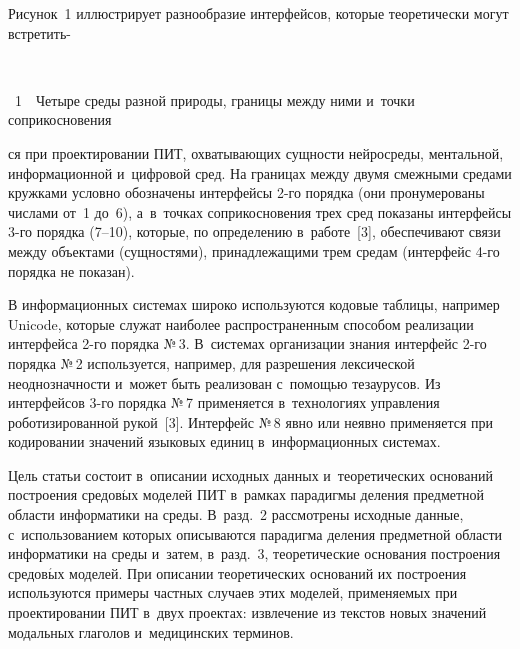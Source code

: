 \begin{multicols}{2}
  Рисунок~1 иллюстрирует разнообразие интерфейсов, которые 
теоретически могут встретить-\linebreak\vspace*{-12pt}

{ \begin{center}  %
 \vspace*{-1pt}
    \mbox{%
\epsfxsize=79mm
}

\end{center}

\noindent
{{\figurename~1}\ \ \small{Четыре среды разной природы, границы между ними и~точки 
соприкосновения
}}}

\vspace*{9pt}

\noindent
ся при проектировании ПИТ, охватывающих 
сущности нейросреды, ментальной, информационной и~цифровой сред. На 
границах между двумя смежными средами кружками условно обозначены 
интерфейсы 2-го порядка (они пронумерованы числами от~1 до~6), 
а~в~точках соприкосновения трех сред показаны интерфейсы 3-го порядка 
(7--10), которые, по определению в~работе~[3], обеспечивают связи между 
объектами (сущностями), принадлежащими трем средам (интерфейс 4-го 
порядка не показан).



  
  В информационных системах широко используются кодовые таблицы, 
например Unicode, которые служат наиболее распространенным способом 
реализации интерфейса 2-го порядка №\,3. В~системах организации знания 
интерфейс 2-го порядка №\,2 используется, например, для разрешения 
лексической неоднозначности и~может быть реализован с~помощью 
тезаурусов. Из интерфейсов 3-го порядка №\,7 применяется в~технологиях 
управления роботизированной рукой~[3]. Интерфейс №\,8 явно или неявно 
применяется при кодировании значений языковых единиц 
в~информационных системах.
  


  Цель статьи состоит в~описании исходных данных и~теоретических 
оснований построения средов$\acute{\mbox{ы}}$х моделей ПИТ в~рамках 
парадигмы деления предметной области информатики на среды. В~разд.~2 
рассмотрены исходные данные, с~использованием которых описываются 
парадигма деления предметной области информатики на среды и~затем, 
в~разд.~3, теоретические основания построения средов$\acute{\mbox{ы}}$х 
моделей. При описании теоретических оснований их построения 
используются примеры частных случаев этих моделей, применяемых при 
проектировании ПИТ в~двух проектах: извлечение из текстов новых значений 
модальных глаголов и~медицинских терминов.


\end{multicols}
